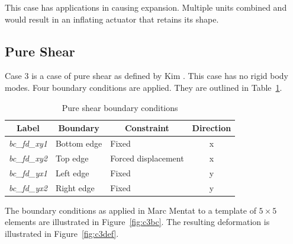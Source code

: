 This case has applications in causing expansion. Multiple units combined and would result in an inflating actuator that retains its shape.

\subsection{Pure Shear}

Case 3 is a case of pure shear as defined by Kim \citep{Kim2015}. This case has no rigid body modes. Four boundary conditions are applied. They are outlined in Table~\ref{tab:c3}.

\begin{table}[H]
\centering
\begin{tabular}{@{}lllc@{}}
\toprule
\multicolumn{1}{c}{\textbf{Label}} & \multicolumn{1}{c}{\textbf{Boundary}} & \multicolumn{1}{c}{\textbf{Constraint}} & \textbf{Direction} \\ \midrule
\textit{bc\_fd\_xy1} & Bottom edge & Fixed               & x \\
\textit{bc\_fd\_xy2} & Top edge    & Forced displacement & x \\
\textit{bc\_fd\_yx1} & Left edge   & Fixed               & y \\
\textit{bc\_fd\_yx2} & Right edge  & Fixed				 & y \\ \bottomrule
\end{tabular}
\caption[Pure shear boundary conditions]{Pure shear boundary conditions \citep{Kim2015}}
\label{tab:c3}
\end{table}

The boundary conditions as applied in Marc Mentat to a template of $5\times 5$ elements are illustrated in Figure~\ref{fig:c3bc}. The resulting deformation is illustrated in Figure~\ref{fig:c3def}.

